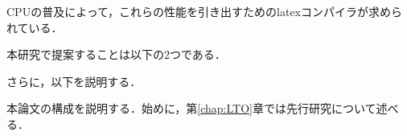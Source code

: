 CPUの普及によって，これらの性能を引き出すためのlatexコンパイラが求められている．%

本研究で提案することは以下の2つである．


さらに，以下を説明する．


本論文の構成を説明する．始めに，第\ref{chap:LTO}章では先行研究について述べる．
